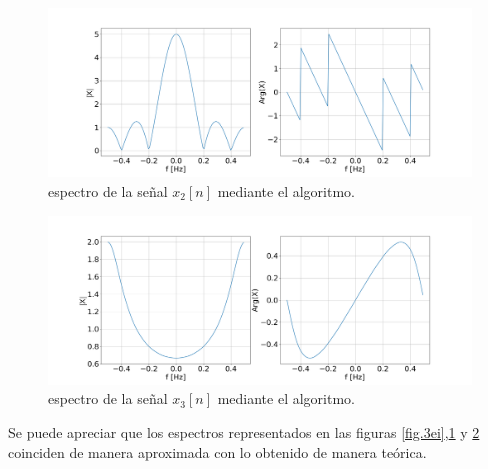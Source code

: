 \documentclass[11pt,a4paper]{article}
\begin{document}
    \begin{figure}[H]
    \centering
    \includegraphics[width=\textwidth]{Img/punto_3_e_2.png}
    \caption{espectro de la señal $x_{2}[n]$ mediante el algoritmo.}
    \label{fig.3eii}
    \end{figure}


    \begin{figure}[H]
    \centering
    \includegraphics[width=\textwidth]{Img/punto_3_e_3.png}
    \caption{espectro de la señal $x_{3}[n]$ mediante el algoritmo.}
    \label{fig.3eiii}
    \end{figure}

    Se puede apreciar que los espectros representados en las figuras \ref{fig.3ei},\ref{fig.3eii} y \ref{fig.3eiii} coinciden de manera aproximada con lo obtenido de manera teórica. 
    
    
\end{document}
